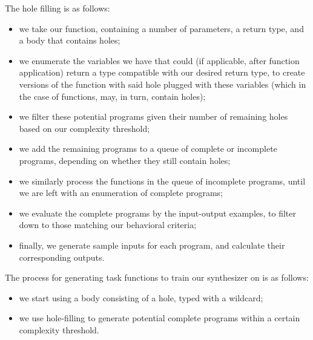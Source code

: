 \documentclass{article}
\begin{document}
The hole filling is as follows:
\begin{itemize}
    \item we take our function, containing a number of parameters, a return type, and a body that contains holes;
    \item we enumerate the variables we have that could (if applicable, after function application) return a type compatible with our desired return type, to create versions of the function with said hole plugged with these variables (which in the case of functions, may, in turn, contain holes);
    \item we filter these potential programs given their number of remaining holes based on our complexity threshold;
    \item we add the remaining programs to a queue of complete or incomplete programs, depending on whether they still contain holes;
    \item we similarly process the functions in the queue of incomplete programs, until we are left with an enumeration of complete programs;
    \item we evaluate the complete programs by the input-output examples, to filter down to those matching our behavioral criteria;
    \item finally, we generate sample inputs for each program, and calculate their corresponding outputs.
\end{itemize}

The process for generating task functions to train our synthesizer on is as follows:
\begin{itemize}
    \item we start using a body consisting of a hole, typed with a wildcard;
    \item we use hole-filling to generate potential complete programs within a certain complexity threshold.
\end{itemize}
\end{document}
